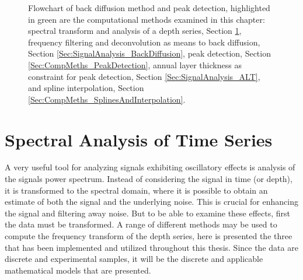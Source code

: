 \documentclass[../../CompleteThesis2/Complete_2ndDraft]{subfiles}
\begin{document}
\begin{figure}[h]
	\caption[Flowchart of back diffusion method]{Flowchart of back diffusion method and peak detection, highlighted in green are the computational methods examined in this chapter: spectral transform and analysis of a depth series, Section \ref{Sec:SignalAnalysis_SpectralAnalysis}, frequency filtering and deconvolution as means to back diffusion, Section \ref{Sec:SignalAnalysis_BackDiffusion}, peak detection, Section \ref{Sec:CompMeths_PeakDetection}, annual layer thickness as constraint for peak detection, Section \ref{Sec:SignalAnalysis_ALT}, and spline interpolation, Section \ref{Sec:CompMeths_SplinesAndInterpolation}.}
	\label{Fig:COMPMETH_Flowchart}
\end{figure}



\section[Spectral Analysis]{Spectral Analysis of Time Series}
\label{Sec:SignalAnalysis_SpectralAnalysis}
A very useful tool for analyzing signals exhibiting oscillatory effects is analysis of the signals power spectrum. Instead of considering the signal in time (or depth), it is transformed to the spectral domain, where it is possible to obtain an estimate of both the signal and the underlying noise. This is crucial for enhancing the signal and filtering away noise. But to be able to examine these effects, first the data must be transformed. A range of different methods may be used to compute the frequency transform of the depth series, here is presented the three that has been implemented and utilized throughout this thesis. Since the data are discrete and experimental samples, it will be the discrete and applicable mathematical models that are presented.

\end{document}
